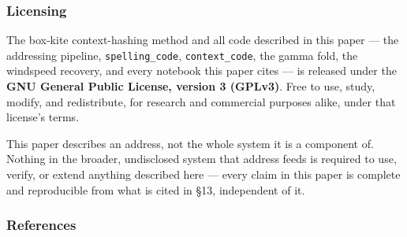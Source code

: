 \documentclass[
  10pt,
]{article}
\begin{document}
\hypertarget{licensing}{%
\subsubsection{Licensing}\label{licensing}}

The box-kite context-hashing method and all code described in this paper
--- the addressing pipeline, \texttt{spelling\_code},
\texttt{context\_code}, the gamma fold, the windspeed recovery, and
every notebook this paper cites --- is released under the \textbf{GNU
General Public License, version 3 (GPLv3)}. Free to use, study, modify,
and redistribute, for research and commercial purposes alike, under that
license's terms.

This paper describes an address, not the whole system it is a component
of. Nothing in the broader, undisclosed system that address feeds is
required to use, verify, or extend anything described here --- every
claim in this paper is complete and reproducible from what is cited in
§13, independent of it.

\hypertarget{references}{%
\subsubsection{References}\label{references}}
\end{document}
